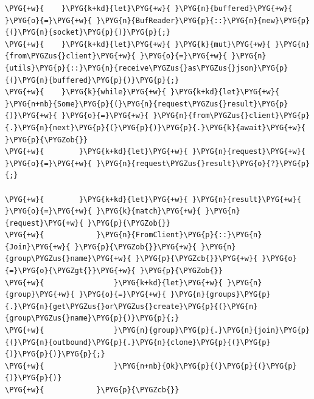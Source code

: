 \begin{Verbatim}[commandchars=\\\{\},breaklines=true,breakanywhere=true,fontsize=\codefont,xleftmargin=17bp]
\PYG{+w}{    }\PYG{k+kd}{let}\PYG{+w}{ }\PYG{n}{buffered}\PYG{+w}{ }\PYG{o}{=}\PYG{+w}{ }\PYG{n}{BufReader}\PYG{p}{::}\PYG{n}{new}\PYG{p}{(}\PYG{n}{socket}\PYG{p}{)}\PYG{p}{;}
\PYG{+w}{    }\PYG{k+kd}{let}\PYG{+w}{ }\PYG{k}{mut}\PYG{+w}{ }\PYG{n}{from\PYGZus{}client}\PYG{+w}{ }\PYG{o}{=}\PYG{+w}{ }\PYG{n}{utils}\PYG{p}{::}\PYG{n}{receive\PYGZus{}as\PYGZus{}json}\PYG{p}{(}\PYG{n}{buffered}\PYG{p}{)}\PYG{p}{;}
\PYG{+w}{    }\PYG{k}{while}\PYG{+w}{ }\PYG{k+kd}{let}\PYG{+w}{ }\PYG{n+nb}{Some}\PYG{p}{(}\PYG{n}{request\PYGZus{}result}\PYG{p}{)}\PYG{+w}{ }\PYG{o}{=}\PYG{+w}{ }\PYG{n}{from\PYGZus{}client}\PYG{p}{.}\PYG{n}{next}\PYG{p}{(}\PYG{p}{)}\PYG{p}{.}\PYG{k}{await}\PYG{+w}{ }\PYG{p}{\PYGZob{}}
\PYG{+w}{        }\PYG{k+kd}{let}\PYG{+w}{ }\PYG{n}{request}\PYG{+w}{ }\PYG{o}{=}\PYG{+w}{ }\PYG{n}{request\PYGZus{}result}\PYG{o}{?}\PYG{p}{;}

\PYG{+w}{        }\PYG{k+kd}{let}\PYG{+w}{ }\PYG{n}{result}\PYG{+w}{ }\PYG{o}{=}\PYG{+w}{ }\PYG{k}{match}\PYG{+w}{ }\PYG{n}{request}\PYG{+w}{ }\PYG{p}{\PYGZob{}}
\PYG{+w}{            }\PYG{n}{FromClient}\PYG{p}{::}\PYG{n}{Join}\PYG{+w}{ }\PYG{p}{\PYGZob{}}\PYG{+w}{ }\PYG{n}{group\PYGZus{}name}\PYG{+w}{ }\PYG{p}{\PYGZcb{}}\PYG{+w}{ }\PYG{o}{=}\PYG{o}{\PYGZgt{}}\PYG{+w}{ }\PYG{p}{\PYGZob{}}
\PYG{+w}{                }\PYG{k+kd}{let}\PYG{+w}{ }\PYG{n}{group}\PYG{+w}{ }\PYG{o}{=}\PYG{+w}{ }\PYG{n}{groups}\PYG{p}{.}\PYG{n}{get\PYGZus{}or\PYGZus{}create}\PYG{p}{(}\PYG{n}{group\PYGZus{}name}\PYG{p}{)}\PYG{p}{;}
\PYG{+w}{                }\PYG{n}{group}\PYG{p}{.}\PYG{n}{join}\PYG{p}{(}\PYG{n}{outbound}\PYG{p}{.}\PYG{n}{clone}\PYG{p}{(}\PYG{p}{)}\PYG{p}{)}\PYG{p}{;}
\PYG{+w}{                }\PYG{n+nb}{Ok}\PYG{p}{(}\PYG{p}{(}\PYG{p}{)}\PYG{p}{)}
\PYG{+w}{            }\PYG{p}{\PYGZcb{}}


\end{Verbatim}
